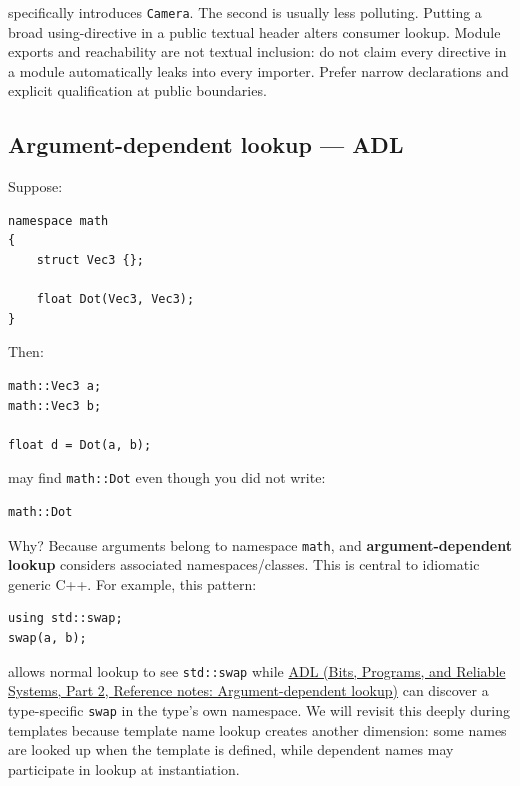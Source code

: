 specifically introduces \texttt{Camera}. The second is usually less polluting. Putting a broad using-directive in a public textual header alters consumer lookup. Module exports and reachability are not textual inclusion: do not claim every directive in a module automatically leaks into every importer. Prefer narrow declarations and explicit qualification at public boundaries.

\subsection{Argument-dependent lookup --- ADL}\label{05-engine-i-ch002-argument-dependent-lookup-adl}

\hypertarget{05-engine-i-ch002-argument-dependent-lookup-adl}{}

Suppose:

\begin{verbatim}
namespace math
{
    struct Vec3 {};

    float Dot(Vec3, Vec3);
}
\end{verbatim}

Then:

\begin{verbatim}
math::Vec3 a;
math::Vec3 b;

float d = Dot(a, b);
\end{verbatim}

may find \texttt{math::Dot} even though you did not write:

\begin{verbatim}
math::Dot
\end{verbatim}

Why? Because arguments belong to namespace \texttt{math}, and \textbf{argument-dependent lookup} considers associated namespaces/classes. This is central to idiomatic generic C++. For example, this pattern:

\begin{verbatim}
using std::swap;
swap(a, b);
\end{verbatim}

allows normal lookup to see \texttt{std::swap} while \href{../01-Bits-Programs-and-Reliable-Systems-P02/main.pdf\#nameddest=appendix-7863714aa97f}{ADL (Bits, Programs, and Reliable Systems, Part 2, Reference notes: Argument-dependent lookup)} can discover a type-specific \texttt{swap} in the type's own namespace. We will revisit this deeply during templates because template name lookup creates another dimension: some names are looked up when the template is defined, while dependent names may participate in lookup at instantiation.

